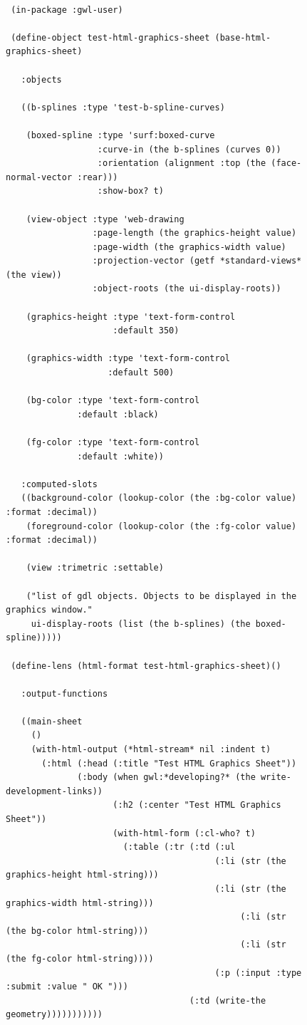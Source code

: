 \documentclass [11pt]{book}
\begin{document}
\begin{itemize}
\begin{figure}
\begin{lrbox}{\boxedverb}
\begin{minipage}{\linewidth}
{\begin{verbatim}

 (in-package :gwl-user)

 (define-object test-html-graphics-sheet (base-html-graphics-sheet)
    
   :objects 

   ((b-splines :type 'test-b-spline-curves)
   
    (boxed-spline :type 'surf:boxed-curve
                  :curve-in (the b-splines (curves 0))
                  :orientation (alignment :top (the (face-normal-vector :rear)))
                  :show-box? t)

    (view-object :type 'web-drawing
                 :page-length (the graphics-height value)
                 :page-width (the graphics-width value)
                 :projection-vector (getf *standard-views* (the view))
                 :object-roots (the ui-display-roots))
   
    (graphics-height :type 'text-form-control
                     :default 350)
   
    (graphics-width :type 'text-form-control
                    :default 500)
   
    (bg-color :type 'text-form-control
              :default :black)
   
    (fg-color :type 'text-form-control
              :default :white))
     
   :computed-slots
   ((background-color (lookup-color (the :bg-color value) :format :decimal))
    (foreground-color (lookup-color (the :fg-color value) :format :decimal))
     
    (view :trimetric :settable)
   
    ("list of gdl objects. Objects to be displayed in the graphics window."
     ui-display-roots (list (the b-splines) (the boxed-spline)))))

 (define-lens (html-format test-html-graphics-sheet)()
   
   :output-functions

   ((main-sheet
     ()
     (with-html-output (*html-stream* nil :indent t)
       (:html (:head (:title "Test HTML Graphics Sheet"))
              (:body (when gwl:*developing?* (the write-development-links))
                     (:h2 (:center "Test HTML Graphics Sheet"))
                     (with-html-form (:cl-who? t)
                       (:table (:tr (:td (:ul 
                                         (:li (str (the graphics-height html-string)))
                                         (:li (str (the graphics-width html-string)))
                                              (:li (str (the bg-color html-string)))
                                              (:li (str (the fg-color html-string))))
                                         (:p (:input :type :submit :value " OK ")))
                                    (:td (write-the geometry)))))))))))


\end{verbatim}}
\end{minipage}
\end{lrbox}
\end{figure}
\end{itemize}
\end{document}
